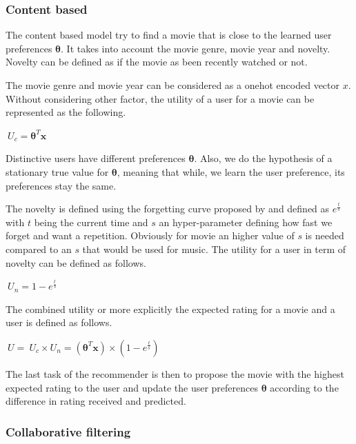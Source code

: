 \documentclass[letterpaper]{article}
\begin{document}
\subsubsection{Content based}

The content based model try to find a movie that is close to the learned user preferences $\boldsymbol{\theta}$. It takes into account the movie genre, movie year and novelty. Novelty can be defined as if the movie as been recently watched or not.

The movie genre and movie year can be considered as a onehot encoded vector $x$.
Without considering other factor, the utility of a user for a movie can be represented as the following.

\begin{center}
	$ \ U_{c} = \boldsymbol{\theta}^{T} \boldsymbol{x}$ 
\end{center}

Distinctive users have different preferences $\boldsymbol{\theta}$. Also, we do the hypothesis of a stationary true value for $\boldsymbol{\theta}$, meaning that while, we learn the user preference, its preferences stay the same.

The novelty is defined using the forgetting curve proposed by \cite{ebbinghaus1913memory} and defined as $ e^{\frac{t}{s}} $ with $t$ being the current time and $s$ an hyper-parameter defining how fast we forget and want a repetition. Obviously for movie an higher value of $s$ is needed compared to an $s$ that would be used for music. The utility for a user in term of novelty can be defined as follows.

\begin{center}
	$ \ U_{n} = 1 - e^{\frac{t}{s}} $ 
\end{center}

The combined utility or more explicitly the expected rating for a movie and a user is defined as follows.

\begin{center}
	$ \ U = \ U_{c} \times  U_{n} = (\boldsymbol{\theta}^{T} \boldsymbol{x}) \times (1 - e^{\frac{t}{s}}) $ 
\end{center}

The last task of the recommender is then to propose the movie with the highest expected rating to the user and update the user preferences $\boldsymbol{\theta}$ according to the difference in rating received and predicted.

\subsubsection{Collaborative filtering}
\end{document}
